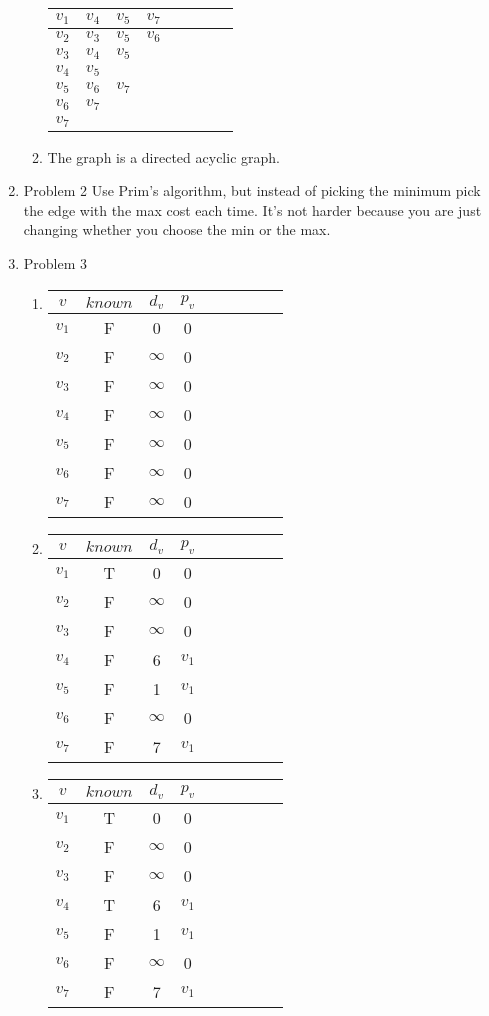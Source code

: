 \documentclass[11pt]{article}
\begin{document}
\begin{enumerate}
\begin{enumerate}
\begin{tabular}{c|ccccccc|}
$v_1$&$v_4$&$v_5$&$v_7$&&&\\
\hline
$v_2$&$v_3$&$v_5$&$v_6$&&&\\
\hline
$v_3$&$v_4$&$v_5$&&&&\\
\hline
$v_4$&$v_5$&&&&&\\
\hline
$v_5$&$v_6$&$v_7$&&&&\\
\hline
$v_6$&$v_7$&&&&&\\
\hline
$v_7$&&&&&&\\
\end{tabular}
\item The graph is a directed acyclic graph.
\end{enumerate}
\item Problem 2
Use Prim's algorithm, but instead of picking the minimum pick the edge with the max cost each time. It's not harder because you are just changing whether you choose the min or the max.
\item Problem 3
\begin{enumerate}
\item \begin{tabular}{ccccccccc}
\hline
$v$&$known$&$d_v$& $p_v$\\
\hline
$v_1$& F & 0 & 0\\
$v_2$& F & $\infty$ & 0\\
$v_3$& F & $\infty$ & 0\\
$v_4$& F & $\infty$ & 0\\
$v_5$& F & $\infty$ & 0\\
$v_6$& F & $\infty$ & 0\\
$v_7$& F & $\infty$ & 0\\\hline
\end{tabular}
\item \begin{tabular}{ccccccccc}
\hline
$v$&$known$&$d_v$& $p_v$\\\hline
$v_1$& T & 0 & 0\\
$v_2$& F & $\infty$ & 0\\
$v_3$& F & $\infty$ & 0\\
$v_4$& F & 6 & $v_1$\\
$v_5$& F & 1 & $v_1$\\
$v_6$& F & $\infty$ & 0\\
$v_7$& F & 7 & $v_1$\\\hline
\end{tabular}
\item \begin{tabular}{ccccccccc}
\hline
$v$&$known$&$d_v$& $p_v$\\\hline
$v_1$& T & 0 & 0\\
$v_2$& F & $\infty$ & 0\\
$v_3$& F & $\infty$ & 0\\
$v_4$& T & 6 & $v_1$\\
$v_5$& F & 1 & $v_1$\\
$v_6$& F & $\infty$ & 0\\
$v_7$& F & 7 & $v_1$\\\hline
\end{tabular}
\end{enumerate}
\end{enumerate}
\end{document}
